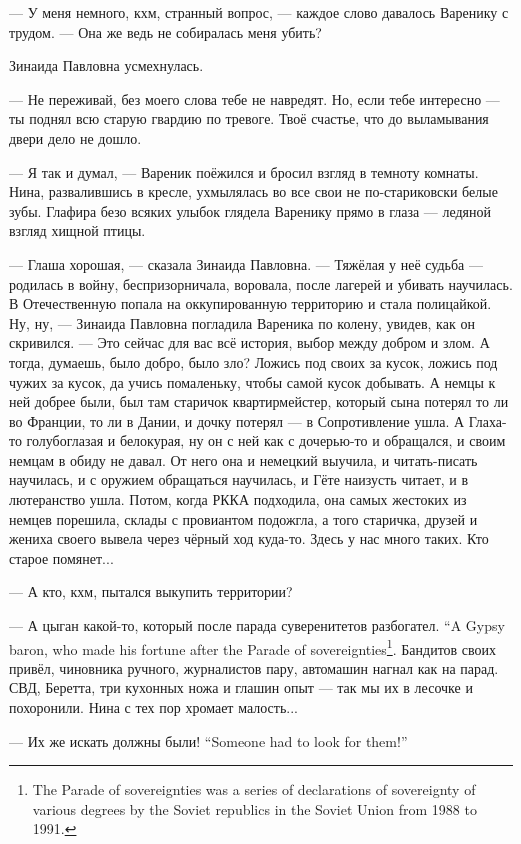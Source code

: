 --- У меня немного, кхм, странный вопрос, --- каждое слово давалось Варенику с трудом.
--- Она же ведь не собиралась меня убить?

Зинаида Павловна усмехнулась.

--- Не переживай, без моего слова тебе не навредят.
Но, если тебе интересно --- ты поднял всю старую гвардию по тревоге.
Твоё счастье, что до выламывания двери дело не дошло.

--- Я так и думал, --- Вареник поёжился и бросил взгляд в темноту комнаты.
Нина, развалившись в кресле, ухмылялась во все свои не по-стариковски белые зубы.
Глафира безо всяких улыбок глядела Варенику прямо в глаза --- ледяной взгляд хищной птицы.

--- Глаша хорошая, --- сказала Зинаида Павловна.
--- Тяжёлая у неё судьба --- родилась в войну, беспризорничала, воровала, после лагерей и убивать научилась.
В Отечественную попала на оккупированную территорию и стала полицайкой.
Ну, ну, --- Зинаида Павловна погладила Вареника по колену, увидев, как он скривился.
--- Это сейчас для вас всё история, выбор между добром и злом.
А тогда, думаешь, было добро, было зло?
Ложись под своих за кусок, ложись под чужих за кусок, да учись помаленьку, чтобы самой кусок добывать.
А немцы к ней добрее были, был там старичок квартирмейстер, который сына потерял то ли во Франции, то ли в Дании, и дочку потерял --- в Сопротивление ушла.
А Глаха-то голубоглазая и белокурая, ну он с ней как с дочерью-то и обращался, и своим немцам в обиду не давал.
От него она и немецкий выучила, и читать-писать научилась, и с оружием обращаться научилась, и Гёте наизусть читает, и в лютеранство ушла.
Потом, когда РККА подходила, она самых жестоких из немцев порешила, склады с провиантом подожгла, а того старичка, друзей и жениха своего вывела через чёрный ход куда-то.
Здесь у нас много таких.
Кто старое помянет...

--- А кто, кхм, пытался выкупить территории?

{--- А цыган какой-то, который после парада суверенитетов разбогател.}
{``A Gypsy baron, who made his fortune after the Parade of sovereignties\footnote{The Parade of sovereignties was a series of declarations of sovereignty of various degrees by the Soviet republics in the Soviet Union from 1988 to 1991.}.}
Бандитов своих привёл, чиновника ручного, журналистов пару, автомашин нагнал как на парад.
СВД, Беретта, три кухонных ножа и глашин опыт --- так мы их в лесочке и похоронили.
Нина с тех пор хромает малость...

{--- Их же искать должны были!}
{``Someone had to look for them!''}

